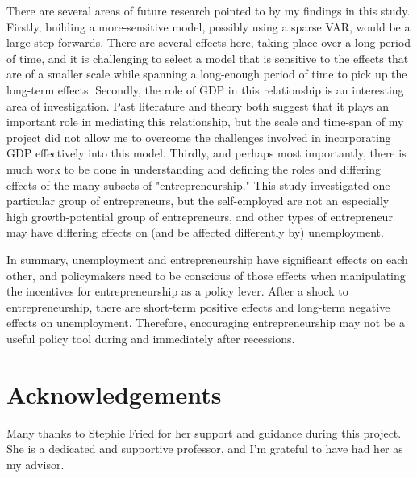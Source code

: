 \documentclass[]{ecca}
\begin{document}
There are several areas of future research pointed to by my findings in this study. Firstly, building a more-sensitive model, possibly using a sparse VAR, would be a large step forwards. There are several effects here, taking place over a long period of time, and it is challenging to select a model that is sensitive to the effects that are of a smaller scale while spanning a long-enough period of time to pick up the long-term effects. Secondly, the role of GDP in this relationship is an interesting area of investigation. Past literature and theory both suggest that it plays an important role in mediating this relationship, but the scale and time-span of my project did not allow me to overcome the challenges involved in incorporating GDP effectively into this model. Thirdly, and perhaps most importantly, there is much work to be done in understanding and defining the roles and differing effects of the many subsets of "entrepreneurship." This study investigated one particular group of entrepreneurs, but the self-employed are not an especially high growth-potential group of entrepreneurs, and other types of entrepreneur may have differing effects on (and be affected differently by) unemployment.

In summary, unemployment and entrepreneurship have significant effects on each other, and policymakers need to be conscious of those effects when manipulating the incentives for entrepreneurship as a policy lever. After a shock to entrepreneurship, there are short-term positive effects and long-term negative effects on unemployment. Therefore, encouraging entrepreneurship may not be a useful policy tool during and immediately after recessions.

\section*{Acknowledgements}

Many thanks to Stephie Fried for her support and guidance during this project. She is a dedicated and supportive professor, and I'm grateful to have had her as my advisor.





\end{document}
